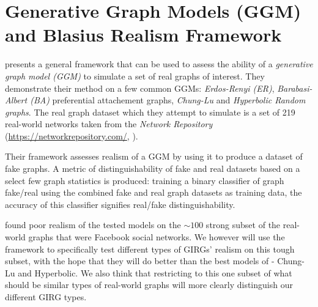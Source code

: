 \chapter{Generative Graph Models (GGM) and Blasius Realism Framework}
\label{chap:GGM}
\minitoc


\cite{blasius2018towards} presents a general framework that can be used to assess the ability of a \textit{generative graph model (GGM)} to simulate a set of real graphs of interest. They demonstrate their method on a few common GGMs: \textit{Erdos-Renyi (ER)}, \textit{Barabasi-Albert (BA)} preferential attachement graphs, \textit{Chung-Lu} and \textit{Hyperbolic Random graphs}. The real graph dataset which they attempt to simulate is a set of 219 real-world networks taken from the \textit{Network Repository} (\url{https://networkrepository.com/}, \cite{rossi2015network}).

Their framework assesses realism of a GGM by using it to produce a dataset of fake graphs. A metric of distinguishability of fake and real datasets based on a select few graph statistics is produced: training a binary classifier of graph \textrightarrow fake/real using the combined fake and real graph datasets as training data, the accuracy of this classifier signifies real/fake distinguishability.

\cite{blasius2018towards} found poor realism of the tested models on the $\sim 100$ strong subset of the real-world graphs that were Facebook social networks. We however will use the framework to specifically test different types of GIRGs' realism on this tough subset, with the hope that they will do better than the best models of \cite{blasius2018towards} - Chung-Lu and Hyperbolic. We also think that restricting to this one subset of what should be similar types of real-world graphs will more clearly distinguish our different GIRG types.



